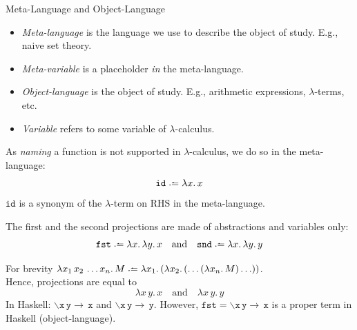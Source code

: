 \begin{frame}{Meta-Language and Object-Language}
  \begin{itemize}
    \item \emph{Meta-language} is the language we use to describe the object of
      study. E.g., naive set theory. 
    \item \emph{Meta-variable} is a placeholder \emph{in} the meta-language. 
    \item \emph{Object-language} is the object of study. E.g., arithmetic
      expressions, $\lambda$-terms, etc.
    \item \emph{Variable} refers to some variable of $\lambda$-calculus.
  \end{itemize}
  \begin{example}
  As \emph{naming} a function is not supported in $\lambda$-calculus, we do so
  in the meta-language:
    \[
      \mathtt{id} \defeq \lambda x.\, x
    \]
    $\mathtt{id}$ is a synonym of the $\lambda$-term on RHS in the meta-language.
  \end{example}
 
\end{frame}

\begin{frame}
  \begin{example}[Projections]
  The first and the second projections are made of abstractions and
  variables only:
  \[
    \mathtt{fst} \defeq \lambda x.\, \lambda y.\, x
    \quad\text{and}\quad \mathtt{snd} \defeq \lambda x.\, \lambda y.\, y
  \]
  \end{example}
  For brevity $\lambda x_1\,x_2\,\ldots x_n.\, M \defeq \lambda x_1.\,(\lambda
  x_2.\,(\ldots (\lambda x_n.\, M)\ldots))$.\\
  Hence, projections are equal to
  \[
    \lambda x\,y.\, x \quad\text{and}\quad 
    \lambda x\,y.\, y
  \]
  In Haskell: $\mathtt{\backslash x\,y \to \,x}$ and
  $\mathtt{\backslash x\,y \to \,y}$. However, $\mathtt{fst} =
  \mathtt{\backslash x\,y \to \,x}$ is a proper term in Haskell
  (object-language).
\end{frame}

